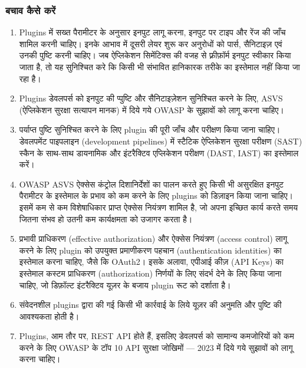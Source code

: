\documentclass[
]{article}
\providecommand{\tightlist}{%
  \setlength{\itemsep}{0pt}\setlength{\parskip}{0pt}}
\begin{document}
\subsubsection{बचाव कैसे करें}\label{ux92cux91aux935-ux915ux938-ux915ux930}

\begin{enumerate}
\def\labelenumi{\arabic{enumi}.}
\tightlist
\item
  Plugins में सख्त पैरामीटर के अनुसार इनपुट लागू करना, इनपुट पर टाइप और रेंज की जाँच
  शामिल करनी चाहिए। इनके आभाव में दूसरी लेयर शुरू कर अनुरोधों को पार्स, सैनिटाइज़ एवं
  उनकी पुष्टि करनी चाहिए। जब ऐप्लिकेशन सिमेंटिक्स की वजह से फ़्रीफ़ॉर्म इनपुट स्वीकार
  किया जाता है, तो यह सुनिश्चित करे कि किसी भी संभावित हानिकारक तरीके का
  इस्तेमाल नहीं किया जा रहा है।
\item
  Plugins डेवलपर्स को इनपुट की प्पुष्टि और सैनिटाइज़ेशन सुनिश्चित करने के लिए, ASVS
  (ऐप्लिकेशन सुरक्षा सत्यापन मानक) में दिये गये OWASP के सुझावों को लागू करना चाहिए।
\item
  पर्याप्त पुष्टि सुनिश्चित करने के लिए plugin की पूरी जाँच और परीक्षण किया जाना
  चाहिए। डेवलपमेंट पाइपलाइन (development pipelines) में स्टैटिक ऐप्लिकेशन सुरक्षा
  परीक्षण (SAST) स्कैन के साथ-साथ डायनामिक और इंटरैक्टिव एप्लिकेशन परीक्षण (DAST,
  IAST) का इस्तेमाल करें।
\item
  OWASP ASVS ऐक्सेस कंट्रोल दिशानिर्देशों का पालन करते हुए किसी भी असुरक्षित इनपुट
  पैरामीटर के इस्तेमाल के प्रभाव को कम करने के लिए plugins को डिज़ाइन किया जाना
  चाहिए। इसमें कम से कम विशेषाधिकार प्राप्त ऐक्सेस नियंत्रण शामिल है, जो अपना इच्छित
  कार्य करते समय जितना संभव हो उतनी कम कार्यक्षमता को उजागर करता है।
\item
  प्रभावी प्राधिकरण (effective authorization) और ऐक्सेस नियंत्रण (access
  control) लागू करने के लिए plugin को उपयुक्त प्रमाणीकरण पहचान (authentication
  identities) का इस्तेमाल करना चाहिए, जैसे कि OAuth2। इसके अलावा, एपीआई कीज़
  (API Keys) का इस्तेमाल कस्टम प्राधिकरण (authorization) निर्णयों के लिए संदर्भ
  देने के लिए किया जाना चाहिए, जो डिफ़ॉल्ट इंटरैक्टिव यूज़र के बजाय plugin रूट को
  दर्शाता है।
\item
  संवेदनशील plugins द्वारा की गई किसी भी कार्रवाई के लिये यूज़र की अनुमति और पुष्टि
  की आवश्यकता होती है।
\item
  Plugins, आम तौर पर, REST API होते हैं, इसलिए डेवलपर्स को सामान्य कमजोरियों को
  कम करने के लिए OWASP के टॉप 10 API सुरक्षा जोखिमों --- 2023 में दिये गये सुझावों
  को लागू करना चाहिए।
\end{enumerate}
\end{document}

